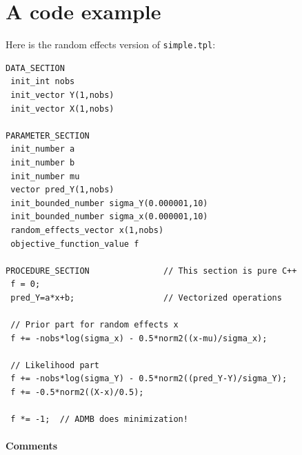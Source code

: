 \documentclass{admbmanual}
\begin{document}
\section{A code example\label{sec:code example}}

Here is the random effects version of \texttt{simple.tpl}:
\begin{lstlisting}
DATA_SECTION
 init_int nobs
 init_vector Y(1,nobs)
 init_vector X(1,nobs)

PARAMETER_SECTION
 init_number a
 init_number b
 init_number mu
 vector pred_Y(1,nobs)
 init_bounded_number sigma_Y(0.000001,10)
 init_bounded_number sigma_x(0.000001,10)
 random_effects_vector x(1,nobs)
 objective_function_value f

PROCEDURE_SECTION               // This section is pure C++
 f = 0;
 pred_Y=a*x+b;                  // Vectorized operations

 // Prior part for random effects x
 f += -nobs*log(sigma_x) - 0.5*norm2((x-mu)/sigma_x);

 // Likelihood part
 f += -nobs*log(sigma_Y) - 0.5*norm2((pred_Y-Y)/sigma_Y);
 f += -0.5*norm2((X-x)/0.5);

 f *= -1;  // ADMB does minimization!
\end{lstlisting}


\paragraph{Comments}
\end{document}
